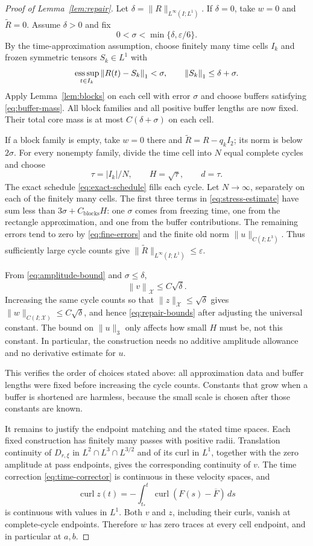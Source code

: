 \documentclass[11pt,a4paper,reqno]{amsart}
\theoremstyle{plain}
\theoremstyle{definition}
\theoremstyle{remark}
\numberwithin{equation}{section}
\newcommand{\X}{\mathcal X}
\newcommand{\curl}{\operatorname{curl}}
\newcommand{\norm}[2]{\left\|#1\right\|_{#2}}
\begin{document}
\begin{proof}[Proof of Lemma~\ref{lem:repair}]
Let $\delta=\|R\|_{L^\infty(I;L^1)}$. If $\delta=0$, take
$w=0$ and $\widetilde R=0$. Assume $\delta>0$ and fix
\[
 0<\sigma<\min\{\delta,\varepsilon/6\}.
\]
By the time-approximation assumption, choose finitely many time
cells $I_k$
and frozen symmetric tensors $S_k\in L^1$ with
\[
 \mathop{\rm ess\,sup}_{t\in I_k}\norm{R(t)-S_k}1<\sigma,
 \qquad\norm{S_k}1\le\delta+\sigma.
\]
Apply Lemma~\ref{lem:blocks} on each cell with error $\sigma$ and
choose buffers satisfying \eqref{eq:buffer-mass}. All block families
and all positive buffer lengths are now fixed. Their total core mass
is at most $C(\delta+\sigma)$ on each cell.

If a block family is empty, take $w=0$ there and
$\widetilde R=R-q_kI_2$; its norm is below $2\sigma$.
For every nonempty family, divide the time cell into $N$ equal complete
cycles and choose
\[
 \tau=|I_k|/N,\qquad H=\sqrt\tau,\qquad d=\tau.
\]
The exact schedule \eqref{eq:exact-schedule} fills each cycle.
Let $N\to\infty$, separately on each of the finitely many cells.
The first three terms in \eqref{eq:stress-estimate} have sum less
than $3\sigma+C_{\mathrm{blocks}}H$: one $\sigma$ comes from
freezing time, one from the rectangle approximation, and one from
the buffer contributions. The remaining errors tend
to zero by \eqref{eq:fine-errors} and the finite old norm
$\|u\|_{C(I;L^3)}$. Thus sufficiently large cycle counts give
$\|\widetilde R\|_{L^\infty(I;L^1)}\le\varepsilon$.

From \eqref{eq:amplitude-bound} and $\sigma\le\delta$,
\[
 \norm v\X\le C\sqrt\delta.
\]
Increasing the same cycle counts so that $\|z\|_\X\le\sqrt\delta$
gives $\|w\|_{C(I;\X)}\le C\sqrt\delta$, and hence
\eqref{eq:repair-bounds} after adjusting the universal constant.
The bound on $\|u\|_3$ only affects how small $H$ must be, not this
constant. In particular, the construction needs no additive amplitude
allowance and no derivative estimate for $u$.

This verifies the order of choices stated above: all approximation
data and buffer lengths were fixed before increasing the cycle
counts. Constants that grow when a buffer is shortened are harmless,
because the small scale is chosen after those constants are known.

It remains to justify the endpoint matching and the stated time
spaces. Each fixed
construction has finitely many passes with positive radii. Translation
continuity of $D_{r,\xi}$ in $L^2\cap L^3\cap L^{3/2}$ and of its
curl in $L^1$, together with the zero amplitude at pass endpoints,
gives the corresponding continuity of $v$. The time correction
\eqref{eq:time-corrector} is continuous in these velocity spaces, and
\[
 \curl z(t)=-\int_{t_*}^t
          \curl(F(s)-\overline F)\,ds
\]
is continuous with values in $L^1$. Both $v$ and $z$, including
their curls, vanish at complete-cycle endpoints. Therefore $w$ has
zero traces at every cell endpoint, and in particular at $a,b$.


\end{proof}
\end{document}
